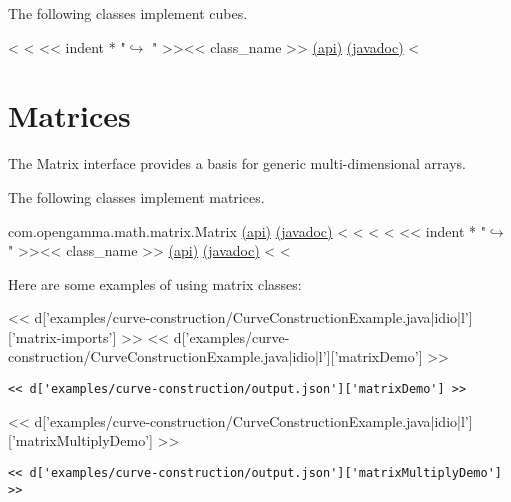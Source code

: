 The following classes implement cubes.

\begin{fullwidth}
<%
<%
<< indent * "$\hookrightarrow$ " >><< class_name >> \href{http://docs-static.opengamma.com/<< OG_VERSION >>/analytics/api/<< package_name >>.html#class-<<class_name>>}{(api)} \href{http://docs-static.opengamma.com/<< OG_VERSION >>/java/javadocs/<< class_name.replace(".","/") >>.html}{(javadoc)}
<%
\end{fullwidth}

\section{Matrices}

The Matrix interface provides a basis for generic multi-dimensional arrays.

The following classes implement matrices.

\begin{fullwidth}
com.opengamma.math.matrix.Matrix \href{http://docs-static.opengamma.com/<< OG_VERSION >>/analytics/api/com.opengamma.math.matrix.Matrix.html#class-com.opengamma.math.matrix.Matrix}{(api)} \href{http://docs-static.opengamma.com/<< OG_VERSION >>/analytics/javadoc/com/opengamma/math/matrix/Matrix}{(javadoc)}
<%
<%
<%
<%
<< indent * "$\hookrightarrow$ " >><< class_name >> \href{http://docs-static.opengamma.com/<< OG_VERSION >>/analytics/api/<< package_name >>.html#class-<<class_name>>}{(api)} \href{http://docs-static.opengamma.com/<< OG_VERSION >>/java/javadocs/<< class_name.replace(".","/") >>.html}{(javadoc)}
<%
<%

\end{fullwidth}


Here are some examples of using matrix classes:

<< d['examples/curve-construction/CurveConstructionExample.java|idio|l']['matrix-imports'] >>
<< d['examples/curve-construction/CurveConstructionExample.java|idio|l']['matrixDemo'] >>

\begin{Verbatim}
<< d['examples/curve-construction/output.json']['matrixDemo'] >>
\end{Verbatim}

<< d['examples/curve-construction/CurveConstructionExample.java|idio|l']['matrixMultiplyDemo'] >>

\begin{Verbatim}
<< d['examples/curve-construction/output.json']['matrixMultiplyDemo'] >>
\end{Verbatim}
